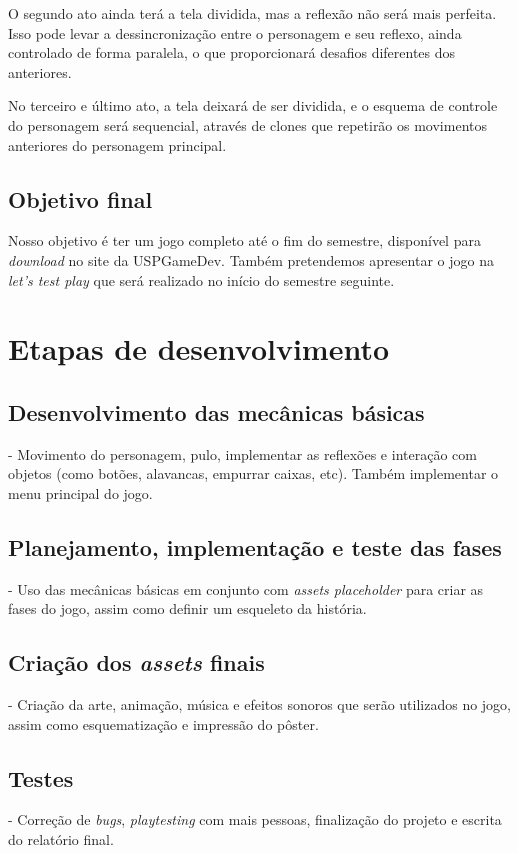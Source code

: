 \documentclass[a4paper, 11pt]{article}
\begin{document}
	O segundo ato ainda terá a tela dividida, mas a reflexão não será mais perfeita. Isso pode levar a dessincronização
entre o personagem e seu reflexo, ainda controlado de forma paralela, o que proporcionará desafios diferentes
dos anteriores.

	No terceiro e último ato, a tela deixará de ser dividida, e o esquema de controle do personagem será sequencial,
através de clones que repetirão os movimentos anteriores do personagem principal.   

\subsection{Objetivo final}
	Nosso objetivo é ter um jogo completo até o fim do semestre, disponível para \textit{download} no site
da USPGameDev. Também pretendemos apresentar o jogo na \textit{let's test play} que será realizado no início
do semestre seguinte. 


\section{Etapas de desenvolvimento}

	\subsection{Desenvolvimento das mecânicas básicas} - Movimento do personagem, pulo, implementar as reflexões e interação com objetos (como botões, alavancas, empurrar caixas, etc). Também implementar o menu principal do jogo.

	\subsection{Planejamento, implementação e teste das fases} - Uso das mecânicas básicas em conjunto com \textit{assets placeholder} para criar as fases do jogo, assim como definir um esqueleto da história.

	\subsection{Criação dos \textit{assets} finais} - Criação da arte, animação, música e efeitos sonoros que serão utilizados no jogo, assim como esquematização e impressão do pôster.

	\subsection{Testes} - Correção de \textit{bugs}, \textit{playtesting} com mais pessoas, finalização do projeto e escrita do relatório final.
\end{document}
